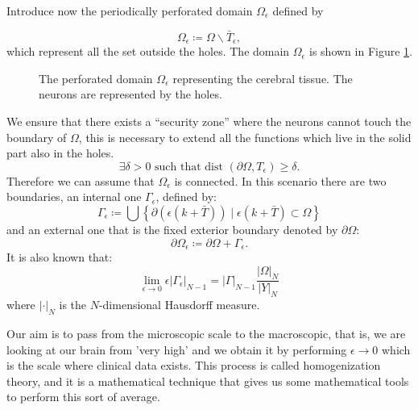 Introduce now the periodically perforated domain $\Omega_{\epsilon}$ defined by

$$
\Omega_{\epsilon} \coloneqq \Omega \backslash \bar{T}_{\epsilon},
$$
which represent all the set outside the holes. The domain $\Omega_{\epsilon}$ is shown in Figure \ref{fig:perforated_domain}.
\begin{figure}[H]
    \centering
    \caption{The perforated domain $\Omega_\epsilon$ representing the cerebral tissue. The neurons are represented by the holes.}
    \label{fig:perforated_domain}
  \end{figure}

We ensure that there exists a ``security zone'' where the neurons cannot touch the boundary of \(\Omega\), this is necessary to extend all the functions which live in the solid part also in the holes.
\begin{equation}
  \exists \delta>0 \text { such that dist }\left(\partial\Omega, T_{\epsilon}\right)\geq\delta.
\label{eq:security_zone}
\end{equation}
Therefore we can assume that $\Omega_{\epsilon}$ is connected. In this scenario there are two boundaries, an internal one $\Gamma_{\epsilon}$, defined by:
$$
\Gamma_{\epsilon} \coloneqq \bigcup\left\{\partial(\epsilon(k+\bar{T})) \mid \epsilon(k+\bar{T}) \subset \Omega\right\}
$$
and an external one that is the fixed exterior boundary denoted by $\partial \Omega$:
$$
\partial\Omega_{\epsilon}\coloneqq\partial\Omega+\Gamma_{\epsilon}.
$$
It is also known that:
\begin{equation}
  \lim _{\epsilon \rightarrow 0} \epsilon\left|\Gamma_{\epsilon}\right|_{N-1}=|\Gamma|_{N-1} \frac{|\Omega|_{N}}{|Y|_{N}}
\label{eq:limit_gamma_eps}
\end{equation}
where $|\cdot|_{N}$ is the $N$-dimensional Hausdorff measure.

Our aim is to pass from the microscopic scale to the macroscopic, that is, we are looking at our brain from 'very high' and we obtain it by performing $\epsilon \rightarrow 0$ which is the scale where clinical data exists. This process is called homogenization theory, and it is a mathematical technique that gives us some mathematical tools to perform this sort of average.
